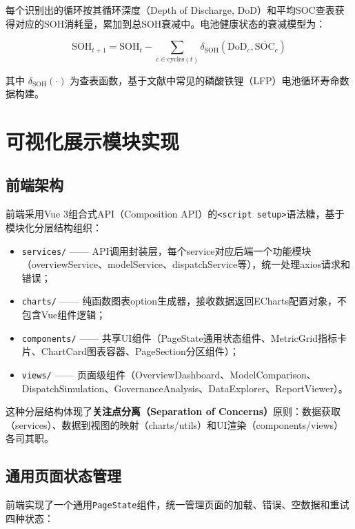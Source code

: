 \documentclass[12pt,a4paper]{ctexbook}
\begin{document}
每个识别出的循环按其循环深度（Depth of Discharge, DoD）和平均SOC查表获得对应的SOH消耗量，累加到总SOH衰减中。电池健康状态的衰减模型为：\cite{battery-degradation-review-2021,rainflow-soc-2022}

\begin{equation}
\text{SOH}_{t+1} = \text{SOH}_{t} - \sum_{c \in \text{cycles}(t)} \delta_{\text{SOH}}(\text{DoD}_c, \overline{\text{SOC}}_c)
\label{eq:soh}
\end{equation}

其中 $\delta_{\text{SOH}}(\cdot)$ 为查表函数，基于文献中常见的磷酸铁锂（LFP）电池循环寿命数据构建。

\section{可视化展示模块实现}

\subsection{前端架构}

前端采用Vue 3组合式API（Composition API）的\texttt{<script setup>}语法糖，基于模块化分层结构组织：\cite{vue3}

\begin{itemize}
  \item \texttt{services/} —— API调用封装层，每个service对应后端一个功能模块（overviewService、modelService、dispatchService等），统一处理axios请求和错误；
  \item \texttt{charts/} —— 纯函数图表option生成器，接收数据返回ECharts配置对象，不包含Vue组件逻辑；
  \item \texttt{components/} —— 共享UI组件（PageState通用状态组件、MetricGrid指标卡片、ChartCard图表容器、PageSection分区组件）；
  \item \texttt{views/} —— 页面级组件（OverviewDashboard、ModelComparison、DispatchSimulation、GovernanceAnalysis、DataExplorer、ReportViewer）。
\end{itemize}

这种分层结构体现了\textbf{关注点分离（Separation of Concerns）}原则：数据获取（services）、数据到视图的映射（charts/utils）和UI渲染（components/views）各司其职。\cite{design-patterns,vue3}

\subsection{通用页面状态管理}

前端实现了一个通用\texttt{PageState}组件，统一管理页面的加载、错误、空数据和重试四种状态：
\end{document}
